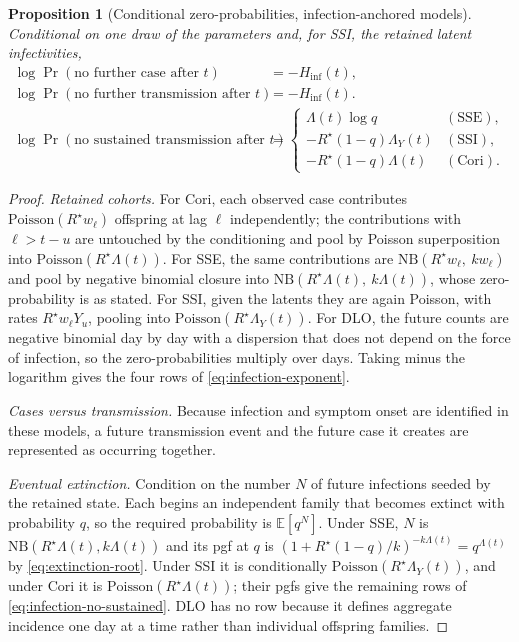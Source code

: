 \documentclass[11pt,a4paper]{article}
\theoremstyle{plain}
\newtheorem{proposition}{Proposition}
\theoremstyle{definition}
\newcommand{\Rreset}{R^{\star}}
\newcommand{\NB}{\mathrm{NB}}
\newcommand{\Pois}{\mathrm{Poisson}}
\newcommand{\dlo}{DLO}
\newcommand{\sse}{SSE}
\newcommand{\ssi}{SSI}
\newcommand{\cori}{Cori}
\begin{document}
\begin{proposition}[Conditional zero-probabilities, infection-anchored models]
\label{prop:naive}
Conditional on one draw of the parameters and, for \ssi{}, the retained latent infectivities,
\begin{align}
  \log\Pr(\text{no further case after }t) &= -H_{\mathrm{inf}}(t),
  \label{eq:infection-no-case}\\
  \log\Pr(\text{no further transmission after }t) &= -H_{\mathrm{inf}}(t).
  \label{eq:infection-no-transmission}\\
  \log\Pr(\text{no sustained transmission after }t)
  &=
  \begin{cases}
    \Lambda(t)\log q & (\text{\sse{}}),\\
    -\Rreset(1-q)\Lambda_Y(t) & (\text{\ssi{}}),\\
    -\Rreset(1-q)\Lambda(t) & (\text{\cori{}}).
  \end{cases}
  \label{eq:infection-no-sustained}
\end{align}
\end{proposition}

\begin{proof}
\emph{Retained cohorts.}
For \cori{}, each observed case contributes $\Pois(\Rreset w_\ell)$ offspring at lag $\ell$
independently; the contributions with $\ell > t-u$ are untouched by the conditioning and pool by
Poisson superposition into $\Pois(\Rreset\Lambda(t))$. For \sse{}, the same contributions are
$\NB(\Rreset w_\ell,\ k w_\ell)$ and pool by negative binomial closure into
$\NB(\Rreset\Lambda(t),\ k\Lambda(t))$, whose zero-probability is as stated. For \ssi{}, given
the latents they are again Poisson, with rates $\Rreset w_\ell Y_u$, pooling into
$\Pois(\Rreset\Lambda_Y(t))$. For \dlo{}, the future counts are negative binomial day by day with
a dispersion that does not depend on the force of infection, so the zero-probabilities multiply
over days. Taking minus the logarithm gives the four rows of \eqref{eq:infection-exponent}.

\emph{Cases versus transmission.}
Because infection and symptom onset are identified in these models, a future transmission event
and the future case it creates are represented as occurring together.

\emph{Eventual extinction.}
Condition on the number $N$ of future infections seeded by the retained state. Each begins an
independent family that becomes extinct with probability $q$, so the required probability is
$\mathbb{E}[q^N]$. Under \sse{}, $N$ is
$\NB(\Rreset\Lambda(t),k\Lambda(t))$ and its pgf at $q$ is
$(1+\Rreset(1-q)/k)^{-k\Lambda(t)}=q^{\Lambda(t)}$ by
\eqref{eq:extinction-root}. Under \ssi{} it is conditionally
$\Pois(\Rreset\Lambda_Y(t))$, and under \cori{} it is
$\Pois(\Rreset\Lambda(t))$; their pgfs give the remaining rows of
\eqref{eq:infection-no-sustained}. \dlo{} has no row because it defines aggregate incidence
one day at a time rather than individual offspring families.
\end{proof}
\end{document}
